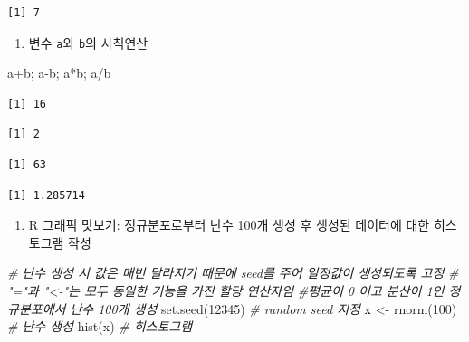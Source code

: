\documentclass[
  11pt,
]{krantz}
\newenvironment{Shaded}{\begin{snugshade}}{\end{snugshade}}
\newcommand{\CommentTok}[1]{\textcolor[rgb]{0.37,0.37,0.37}{\textit{#1}}}
\newcommand{\DecValTok}[1]{\textcolor[rgb]{0.06,0.06,0.06}{#1}}
\newcommand{\FunctionTok}[1]{\textcolor[rgb]{0,0,0}{#1}}
\newcommand{\NormalTok}[1]{#1}
\newcommand{\OtherTok}[1]{\textcolor[rgb]{0.37,0.37,0.37}{#1}}
\newcommand{\SpecialCharTok}[1]{\textcolor[rgb]{0,0,0}{#1}}
\providecommand{\tightlist}{%
  \setlength{\itemsep}{0pt}\setlength{\parskip}{0pt}}
\begin{document}
\begin{verbatim}
[1] 7
\end{verbatim}

\normalsize

\begin{enumerate}
\def\labelenumi{\arabic{enumi}.}
\setcounter{enumi}{3}
\tightlist
\item
  변수 \texttt{a}와 \texttt{b}의 사칙연산
\end{enumerate}

\footnotesize

\begin{Shaded}
\begin{Highlighting}[]
\NormalTok{a}\SpecialCharTok{+}\NormalTok{b; a}\SpecialCharTok{{-}}\NormalTok{b; a}\SpecialCharTok{*}\NormalTok{b; a}\SpecialCharTok{/}\NormalTok{b}
\end{Highlighting}
\end{Shaded}

\begin{verbatim}
[1] 16
\end{verbatim}

\begin{verbatim}
[1] 2
\end{verbatim}

\begin{verbatim}
[1] 63
\end{verbatim}

\begin{verbatim}
[1] 1.285714
\end{verbatim}

\normalsize

\begin{enumerate}
\def\labelenumi{\arabic{enumi}.}
\setcounter{enumi}{4}
\tightlist
\item
  R 그래픽 맛보기: 정규분포로부터 난수 100개 생성 후 생성된 데이터에 대한 히스토그램 작성
\end{enumerate}

\footnotesize

\begin{Shaded}
\begin{Highlighting}[]
\CommentTok{\# 난수 생성 시 값은 매번 달라지기 때문에 seed를 주어 일정값이 생성되도록 고정}
\CommentTok{\# "="과 "\textless{}{-}"는 모두 동일한 기능을 가진 할당 연산자임}
\CommentTok{\#평균이 0 이고 분산이 1인 정규분포에서 난수 100개 생성}
\FunctionTok{set.seed}\NormalTok{(}\DecValTok{12345}\NormalTok{) }\CommentTok{\# random seed 지정}
\NormalTok{x }\OtherTok{\textless{}{-}} \FunctionTok{rnorm}\NormalTok{(}\DecValTok{100}\NormalTok{) }\CommentTok{\# 난수 생성}
\FunctionTok{hist}\NormalTok{(x) }\CommentTok{\# 히스토그램}
\end{Highlighting}
\end{Shaded}
\end{document}

